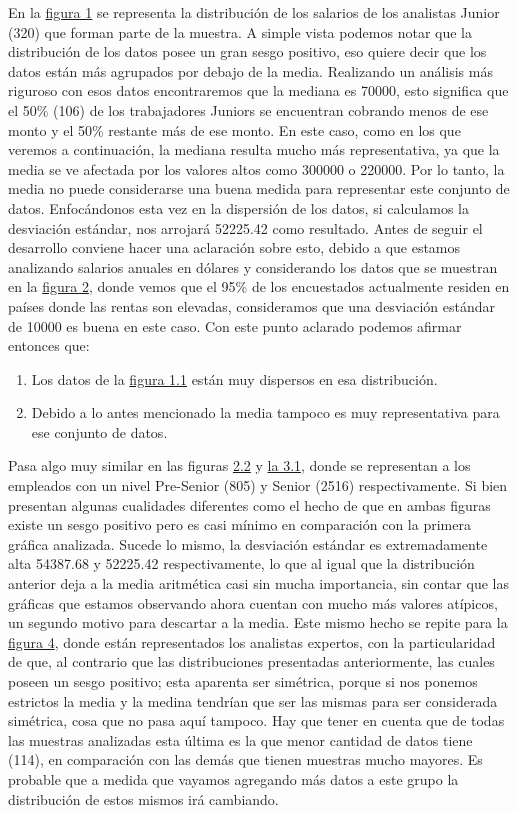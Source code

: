 \documentclass{article}
\begin{document}
	En la \hyperref[figura 1.1 diagrama]{figura 1} se representa la distribución de los salarios de los analistas Junior (320) que forman parte de la muestra. A simple vista podemos notar que la distribución de los datos posee un gran sesgo positivo, eso quiere decir que los datos están más agrupados por debajo de la media.
Realizando un análisis más riguroso con esos datos encontraremos que la mediana es 70000, esto significa que el 50\% (106) de los trabajadores Juniors se encuentran cobrando menos de ese monto y el 50\% restante más de ese monto. En este caso, como en los que veremos a continuación, la mediana resulta mucho más representativa, ya que la media se ve afectada por los valores altos como 300000 o 220000. Por lo tanto, la media no puede considerarse una buena medida para representar este conjunto de datos.
Enfocándonos esta vez en la dispersión de los datos, si calculamos la desviación estándar, nos arrojará 52225.42 como resultado. Antes de seguir el desarrollo conviene hacer una aclaración sobre esto, debido a que estamos analizando salarios anuales en dólares y considerando los datos que se muestran en la 
 \hyperref[figura 2 torta]{figura 2}, donde vemos que el 95\% de los encuestados actualmente residen en países donde las rentas son elevadas, consideramos que una desviación estándar de 10000 es buena en este caso.
	Con este punto aclarado podemos afirmar entonces que: 
	\begin{enumerate}
		\item Los datos de la \hyperref[figura 1.1 diagrama]{figura 1.1} están muy dispersos en esa distribución.
		\item Debido a lo antes mencionado la media tampoco es muy representativa para ese conjunto de datos.
	\end{enumerate}
Pasa algo muy similar en las figuras \hyperref[figura 2.2 diagrama]{2.2} y \hyperref[figura 3.1 diagrama]{la 3.1}, donde se representan a los empleados con un nivel Pre-Senior (805) y Senior (2516) respectivamente. Si bien presentan algunas cualidades diferentes como el hecho de que en ambas figuras existe un sesgo positivo pero es casi mínimo en comparación con la primera gráfica analizada. Sucede lo mismo, la desviación estándar es extremadamente alta 54387.68 y 52225.42 respectivamente, lo que al igual que la distribución anterior deja a la media aritmética casi sin mucha importancia, sin contar que las gráficas que estamos observando ahora cuentan con mucho más valores atípicos, un segundo motivo para descartar a la media.
 Este mismo hecho se repite para la \hyperref[figura 4.1 diagrama]{figura 4}, donde están representados los analistas expertos, con la particularidad de que, al contrario que las distribuciones presentadas anteriormente, las cuales poseen un sesgo positivo; esta aparenta ser simétrica, porque si nos ponemos estrictos la media y la medina tendrían que ser las mismas para ser considerada simétrica, cosa que no pasa aquí tampoco. Hay que tener en cuenta que de todas las muestras analizadas esta última es la que menor cantidad de datos tiene (114), en comparación con las demás que tienen muestras mucho mayores. Es probable que a medida que vayamos agregando más datos a este grupo la distribución de estos mismos irá cambiando.
\end{document}
